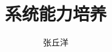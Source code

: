 \documentclass{hustrep}
\author{张丘洋}
\title{系统能力培养}
\begin{document}
\maketitle
\tableofcontents

\newcommand{\arch}{\emph{x86}}
\newcommand{\archpath}{nemu/src/isa/\arch}
\newcommand{\pc}{\emph{pc}}
\newcommand{\eax}{\emph{eax}}








\end{document}

